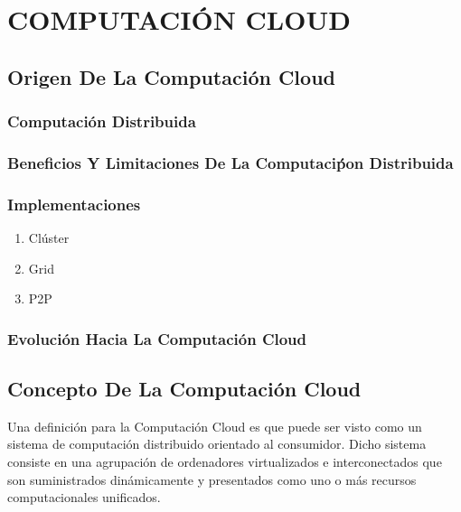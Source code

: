 \documentclass[a4paper, 12pt]{report}
\begin{document}
\chapter{COMPUTACI\'ON CLOUD}\label{cap1}
\pagestyle{plain}
\vspace*{-2em}
\begin{justify}
\end{justify}
\section{Origen De La Computaci\'on Cloud}
\subsection{Computaci\'on Distribuida}
\subsection{Beneficios Y Limitaciones De La Computaci\'pon Distribuida}
\subsection{Implementaciones}
\begin{enumerate}[label=\alph*)]
    \item{Cl\'uster}
    \item{Grid}
    \item{P2P}
\end{enumerate}
\subsection{Evoluci\'on Hacia La Computaci\'on Cloud}
\section{Concepto De La Computaci\'on Cloud}
\begin{justify}
Una definici\'on para la Computaci\'on Cloud es que puede ser visto como un sistema de computaci\'on distribuido orientado al consumidor. Dicho sistema consiste en una agrupaci\'on de ordenadores virtualizados e interconectados que son suministrados din\'amicamente y presentados como uno o m\'as recursos computacionales unificados.
\end{justify}
\end{document}
